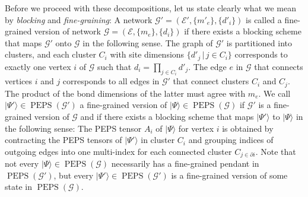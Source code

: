\documentclass[english,11pt,aps,pra,onecolumn,tightenlines,groupedaddress,superscriptaddress,notitlepage,floatfix,fleqn]{revtex4-1}
\newcommand{\ket}{\rangle}
\newcommand{\mc}[1]{\mathcal{#1}}
\newcommand{\E}{\mc{E}}
\newcommand{\G}{\mc{G}}
\newcommand{\PEPS}{\operatorname{PEPS}}
\begin{document}
Before we proceed with these decompositions, let us state clearly what we mean by \emph{blocking} and \emph{fine-graining}: A network $\G'=(\E',\{m'_e\},\{d'_i\})$ is called a fine-grained version of network $\G=(\E,\{m_e\},\{d_i\})$ if there exists a blocking scheme that maps $\G'$ onto $\G$ in the following sense. The graph of $\G'$ is partitioned into clusters, and each cluster $C_i$ with site dimensions $\{d'_{j}\,|\,j\in C_i\}$ corresponds to exactly one vertex $i$ of $\G$ such that $d_i=\prod_{j\in C_i}d'_j$. The edge $e$ in $\G$ that connects vertices $i$ and $j$ corresponds to all edges in $\G'$ that connect clusters $C_i$ and $C_j$. The product of the bond dimensions of the latter must agree with $m_e$. We call $|\Psi'\ket\in\PEPS(\G')$ a fine-grained version of $|\Psi\ket\in\PEPS(\G)$ if $\G'$ is a fine-grained version of $\G$ and if there exists a blocking scheme that maps $|\Psi'\ket$ to $|\Psi\ket$ in the following sense: The PEPS tensor $A_i$ of $|\Psi\ket$ for vertex $i$ is obtained by contracting the PEPS tensors of $|\Psi'\ket$ in cluster $C_i$ and grouping indices of outgoing edges into one multi-index for each connected cluster $C_{j\in\partial i}$. Note that not every $|\Psi\ket\in\PEPS(\G)$ necessarily has a fine-grained pendant in $\PEPS(\G')$, but every $|\Psi'\ket\in\PEPS(\G')$ is a fine-grained version of some state in $\PEPS(\G)$.
\end{document}
